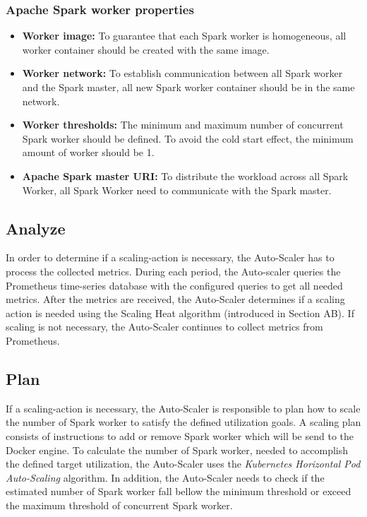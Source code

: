 \subsubsection{Apache Spark worker properties}

\begin{itemize}
\item \textbf{Worker image:} To guarantee that each Spark worker is homogeneous, all worker container should be created with the same image.

\item \textbf{Worker network:} To establish communication between all Spark worker and the Spark master, all new Spark worker container should be in the same network.

\item \textbf{Worker thresholds:} The minimum and maximum number of concurrent Spark worker should be defined. To avoid the cold start effect, the minimum amount of worker should be 1. 

\item \textbf{Apache Spark master URI:} To distribute the workload across all Spark Worker, all Spark Worker need to communicate with the Spark master.
\end{itemize}


\subsection{Analyze}
In order to determine if a scaling-action is necessary, the Auto-Scaler has to process the collected metrics. 
During each period, the Auto-scaler queries the Prometheus time-series database with the configured queries to get all needed metrics. 
After the metrics are received, the Auto-Scaler determines if a scaling action is needed using the Scaling Heat algorithm (introduced in Section AB). If scaling is not necessary, the Auto-Scaler continues to collect metrics from Prometheus.


\subsection{Plan}
If a scaling-action is necessary, the Auto-Scaler is responsible to plan how to scale the number of Spark worker to satisfy the defined utilization goals.
A scaling plan consists of instructions to add or remove Spark worker which will be send to the Docker engine.
To calculate the number of Spark worker, needed to accomplish the defined target utilization, the Auto-Scaler uses the \textit{Kubernetes Horizontal Pod Auto-Scaling} algorithm. In addition, the Auto-Scaler needs to check if the estimated number of Spark worker fall bellow the minimum threshold or exceed the maximum threshold of concurrent Spark worker.


